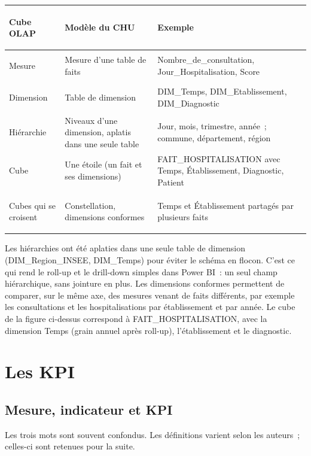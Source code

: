\begin{center}
\small
\begin{tabularx}{\textwidth}{>{\bfseries\raggedright\arraybackslash}p{3.7cm} >{\raggedright\arraybackslash}X >{\raggedright\arraybackslash}X}
\toprule
Cube OLAP & Modèle du CHU & Exemple \\
\midrule
Mesure & Mesure d'une table de faits & Nombre\_de\_consultation, Jour\_Hospitalisation, Score \\
Dimension & Table de dimension & DIM\_Temps, DIM\_Etablissement, DIM\_Diagnostic \\
Hiérarchie & Niveaux d'une dimension, aplatis dans une seule table & Jour, mois, trimestre, année~; commune, département, région \\
Cube & Une étoile (un fait et ses dimensions) & FAIT\_HOSPITALISATION avec Temps, Établissement, Diagnostic, Patient \\
Cubes qui se croisent & Constellation, dimensions conformes & Temps et Établissement partagés par plusieurs faits \\
\bottomrule
\end{tabularx}
\end{center}

\noindent Les hiérarchies ont été aplaties dans une seule table de dimension (DIM\_Region\_INSEE, DIM\_Temps) pour éviter le schéma en flocon. C'est ce qui rend le roll-up et le drill-down simples dans Power BI~: un seul champ hiérarchique, sans jointure en plus. Les dimensions conformes permettent de comparer, sur le même axe, des mesures venant de faits différents, par exemple les consultations et les hospitalisations par établissement et par année. Le cube de la figure ci-dessus correspond à FAIT\_HOSPITALISATION, avec la dimension Temps (grain annuel après roll-up), l'établissement et le diagnostic.

\section{Les KPI}\label{sec:kpi}

\subsection{Mesure, indicateur et KPI}

\noindent Les trois mots sont souvent confondus. Les définitions varient selon les auteurs~; celles-ci sont retenues pour la suite.

